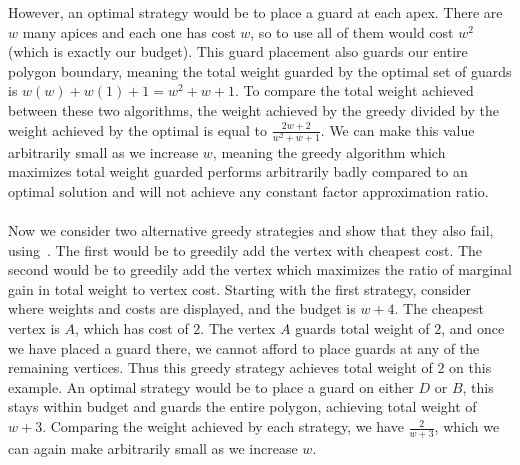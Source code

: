 However, an optimal strategy would be to place a guard at each apex. There are $w$ many apices and each one has cost $w$, so to use all of them would cost $w^2$ (which is exactly our budget). This guard placement also guards our entire polygon boundary, meaning the total weight guarded by the optimal set of guards is $w(w)+w(1)+1=w^2+w+1$. To compare the total weight achieved between these two algorithms, the weight achieved by the greedy divided by the weight achieved by the optimal is equal to $\frac{2w+2}{w^2+w+1}$. We can make this value arbitrarily small as we increase $w$, meaning the greedy algorithm which maximizes total weight guarded performs arbitrarily badly compared to an optimal solution and will not achieve any constant factor approximation ratio.\\\\
Now we consider two alternative greedy strategies and show that they also fail, using~. The first would be to greedily add the vertex with cheapest cost. The second would be to greedily add the vertex which maximizes the ratio of marginal gain in total weight to vertex cost. Starting with the first strategy, consider~ where weights and costs are displayed, and the budget is $w+4$. The cheapest vertex is $A$, which has cost of $2$. The vertex $A$ guards total weight of $2$, and once we have placed a guard there, we cannot afford to place guards at any of the remaining vertices. Thus this greedy strategy achieves total weight of $2$ on this example. An optimal strategy would be to place a guard on either $D$ or $B$, this stays within budget and guards the entire polygon, achieving total weight of $w+3$. Comparing the weight achieved by each strategy, we have $\frac{2}{w+3}$, which we can again make arbitrarily small as we increase $w$.
